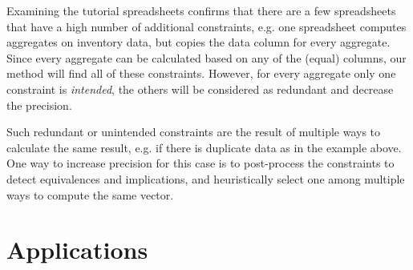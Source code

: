 Examining the tutorial spreadsheets confirms that there are a few spreadsheets that have a high number of additional constraints, e.g. one spreadsheet computes aggregates on inventory data, but copies the data column for every aggregate.
Since every aggregate can be calculated based on any of the (equal) columns, our method will find all of these constraints.
However, for every aggregate only one constraint is \textit{intended}, the others will be considered as redundant and decrease the precision.


Such redundant or unintended constraints are the result of multiple ways to calculate the same result, e.g. if there is duplicate data as in the example above.
One way to increase precision for this case is to post-process the constraints to detect equivalences and implications, and heuristically select one among multiple ways to compute the same vector.









\section{Applications}\label{sec:applications}





